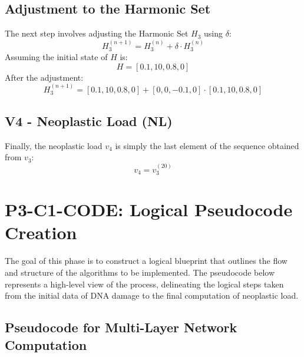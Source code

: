 \documentclass{article}
\begin{document}
\subsection*{Adjustment to the Harmonic Set}
The next step involves adjusting the Harmonic Set $H_3$ using $\delta$:
\begin{equation}
H_3^{(n+1)} = H_3^{(n)} + \delta \cdot H_3^{(n)}
\end{equation}
Assuming the initial state of $H$ is:
\begin{equation}
H = [0.1, 10, 0.8, 0]
\end{equation}
After the adjustment:
\begin{equation}
H_3^{(n+1)} = [0.1, 10, 0.8, 0] + [0,0,-0.1,0] \cdot [0.1, 10, 0.8, 0]
\end{equation}

\subsection*{V4 - Neoplastic Load (NL)}
Finally, the neoplastic load $v_4$ is simply the last element of the sequence obtained from $v_3$:
\begin{equation}
v_4 = v_3^{(20)}
\end{equation}



\section*{P3-C1-CODE: Logical Pseudocode Creation}

The goal of this phase is to construct a logical blueprint that outlines the flow and structure of the algorithms to be implemented. The pseudocode below represents a high-level view of the process, delineating the logical steps taken from the initial data of DNA damage to the final computation of neoplastic load.

\subsection*{Pseudocode for Multi-Layer Network Computation}
\end{document}

